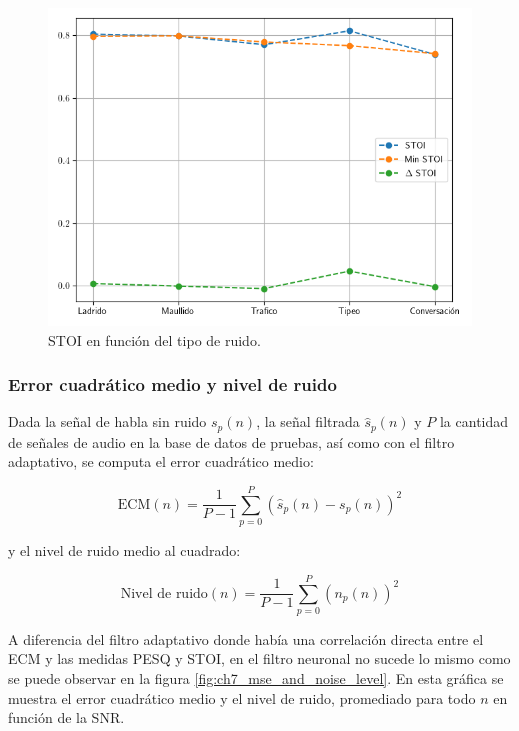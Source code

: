 \begin{figure}
	\centering
	\centerline{\includegraphics[scale=0.75]{images/ch7/dnn_metric_STOI_noises.png}}
	\caption{STOI en función del tipo de ruido.}
	\label{fig:ch7_stoi_resume_by_noise}
\end{figure} 

\subsubsection{Error cuadrático medio y nivel de ruido}

Dada la señal de habla sin ruido $s_p(n)$, la señal filtrada $\hat{s}_p(n)$ y $P$ la cantidad de señales de audio en la base de datos de pruebas, así como con el filtro adaptativo, se computa el error cuadrático medio:

\begin{equation*}
	\text{ECM}(n) = \frac{1}{P-1} \sum_{p=0}^{P} (\hat{s}_p(n) - s_p(n))^2
\end{equation*}

\noindent y el nivel de ruido medio al cuadrado:

\begin{equation*}
	\text{Nivel de ruido}(n) = \frac{1}{P-1} \sum_{p=0}^{P} (n_p(n))^2
\end{equation*}

A diferencia del filtro adaptativo donde había una correlación directa entre el ECM y las medidas PESQ y STOI, en el filtro neuronal no sucede lo mismo como se puede observar en la figura \ref{fig:ch7_mse_and_noise_level}. En esta gráfica se muestra el error cuadrático medio y el nivel de ruido, promediado para todo $n$ en función de la SNR. 

